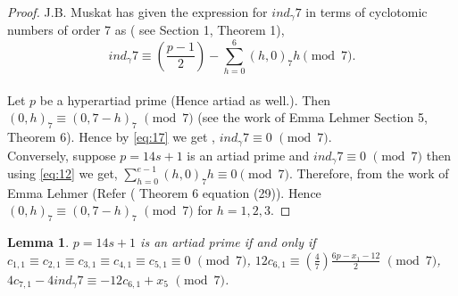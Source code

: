 \documentclass[a4paper,12pt]{article}
\newtheorem{lemma}{Lemma}[section]
\def\vpmod{\!\!\!\pmod}
\begin{document}
\begin{proof}
J.B. Muskat has given the expression  for $ind_{\gamma}7$ in terms of cyclotomic numbers of order 7 as ( see \cite{12} Section 1, Theorem 1), 
\begin{equation}\label{eq:12}
\displaystyle{ind_{\gamma}7\equiv(\frac{p-1}{2})-\sum_{h=0}^{6}(h,0)_{7}h\vpmod 7}.
\end{equation}\\
Let $p$ be a hyperartiad prime (Hence artiad as well.). Then $(0,h)_{7}\equiv(0,7-h)_{7}\,\,\vpmod7$ (see the work of Emma Lehmer \cite{9} Section 5, Theorem 6). Hence 
by \eqref{eq:17} we get , $ind_{\gamma}7\equiv 0\,\,\vpmod 7$.\\
\indent Conversely, suppose $p=14s+1$ is an artiad prime and $ind_{\gamma}7\equiv 0\,\,\vpmod 7$ then using \eqref{eq:12} we get,
$\displaystyle{\sum_{h=0}^{e-1}(h,0)_{7}h\equiv 0\vpmod 7}$. Therefore, from the work of Emma Lehmer (Refer (\cite{15} Theorem 6 equation (29)). Hence $(0,h)_{7}\equiv(0,7-h)_{7}\,\,\vpmod7$ for $h = 1,2,3$.
\end{proof}
\begin{lemma}\label{lem:lemma4}
 $p=14s+1$ is an artiad prime if and only if $c_{1,1}\equiv c_{2,1}\equiv c_{3,1}\equiv c_{4,1}\equiv c_{5,1}\equiv 0\,\,\vpmod 7$, $12c_{6,1}\equiv (\frac{4}{7})\frac{6p-x_{1}-12}{2}\,\,\vpmod 7$, $4c_{7,1}-4ind_{\gamma}7\equiv -12c_{6,1}+x_{5}\,\,\vpmod 7$.
\end{lemma}
\end{document}
